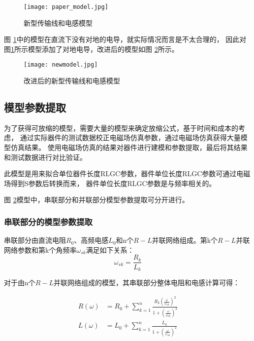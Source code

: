 \begin{figure}[htb]
  \centering
  \texttt{[image: paper\_model.jpg]}
  \caption{新型传输线和电感模型}\label{fig:paper_model.jpg}
\end{figure}
\par
图 \ref{fig:paper_model.jpg}中的模型在直流下没有对地的电导，就实际情况而言是不太合理的，
因此对图\ref{fig:paper_model.jpg}所示模型添加了对地电导，改进后的模型如图 \ref{fig:newmodel}所示。

\begin{figure}[htb]
  \centering
  \texttt{[image: newmodel.jpg]}
  \caption{改进后的新型传输线和电感模型}\label{fig:newmodel}
\end{figure}

\subsection{模型参数提取}
为了获得可放缩的模型，需要大量的模型来确定放缩公式，基于时间和成本的考虑，
通过实际器件的测试数据校正电磁场仿真参数，通过电磁场仿真获得大量模型仿真结果。
使用电磁场仿真的结果对器件进行建模和参数提取，最后将其结果和测试数据进行对比验证。
\par
此模型是用来拟合单位器件长度RLGC参数，器件单位长度RLGC参数可通过电磁场得到S参数后转换而来\cite{eisenstadt1992s}，
器件单位长度RLGC参数是与频率相关的。
\par
图 \ref{fig:newmodel}模型中，串联部分和并联部分模型参数提取可分开进行。


\subsubsection{串联部分的模型参数提取}
串联部分由直流电阻$R_0$、高频电感$L_0$和n个$R-L$并联网络组成。第k个$R-L$并联网络参数和第k个角频率$\omega_{sk}$满足如下关系：
\begin{equation}\label{equ:omegas}
  \omega_{sk}=\frac{R_k}{L_k}
\end{equation}

对于由n个$R-L$并联网络组成的模型，其串联部分整体电阻和电感计算可得：

\begin{align}
  R(\omega)&=R_0+\sum_{k=1}^{n} \frac{R_k (\frac{\omega}{\omega_{sk}})^2} {{1+({\frac{\omega}{\omega_{sk}}})^2}}  \label{equ:R_omega} \\
  L(\omega)&=L_0+\sum_{k=1}^{n} \frac{L_k} {{1+({\frac{\omega}{\omega_{sk}}})^2}}  \label{equ:L_omega}
\end{align}

